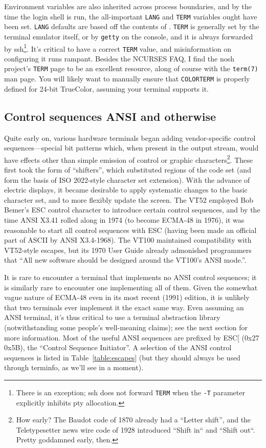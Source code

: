 Environment variables are also inherited across process boundaries, and by the
time the login shell is run, the all-important \texttt{LANG} and \texttt{TERM}
variables ought have been set. \texttt{LANG} defaults are based off the contents
of . \texttt{TERM} is generally set by the terminal emulator itself,
or by \texttt{getty} on the console, and it is always forwarded by ssh\footnote{There is an exception; ssh does not forward \texttt{TERM} when the \texttt{-T}
parameter explicitly inhibits pty allocation.}. It's critical to have a correct \texttt{TERM}
value, and misinformation on configuring it runs rampant. Besides the NCURSES FAQ\cite{ncursesfaq},
I find the nosh project's \texttt{TERM} page\cite{noshterm} to be an excellent
resource, along of course with the \texttt{term(7)} man page\cite{term7}. You
will likely want to manually ensure that \texttt{COLORTERM} is properly defined
for 24-bit TrueColor, assuming your terminal supports it.

\subsection{Control sequences ANSI and otherwise}
\label{sec:escapes}
Quite early on, various hardware terminals began adding vendor-specific control
sequences---special bit patterns which, when present in the output stream,
would have effects other than simple emission of control or graphic
characters\footnote{How early? The Baudot code of 1870 already had a ``Letter
shift'', and the Teletypesetter news wire code of 1928 introduced ``Shift
in`` and ``Shift out``. Pretty goddamned early, then.}. These first took the
form of ``shifters'', which substituted regions of the code set (and form the
basis of ISO 2022-style character set extension). With the advance of electric
displays, it became desirable to apply systematic changes to the basic
character set, and to more flexibly update the screen. The VT52 employed Bob
Bemer's ESC control character\cite{bemeresc} to introduce certain control
sequences, and by the time ANSI X3.41 rolled along in 1974 (to become ECMA-48 in
1976), it was reasonable to start all control sequences with ESC (having been
made an official part of ASCII by ANSI X3.4-1968). The VT100 maintained
compatibility with VT52-style escapes, but its 1970 User Guide already
admonished programmers that ``All new software should be designed around the
VT100's ANSI mode.''\cite{vt100}.

It is rare to encounter a terminal that implements no ANSI control sequences; it is
similarly rare to encounter one implementing all of them. Given the somewhat
vague nature of ECMA-48 even in its most recent (1991) edition\cite{ecma48}, it is unlikely
that two terminals ever implement it the exact same way. Even assuming an ANSI
terminal, it's thus critical to use a terminal abstraction library (notwithstanding
some people's well-meaning claims\cite{lexihale}); see the next section for
more information. Most of the useful ANSI sequences are prefixed by ESC[ (0x27 0x5B),
the ``Control Sequence Initiator''. A selection of the ANSI control sequences
is listed in Table~\ref{table:escapes} (but they should always be used through
terminfo, as we'll see in a moment).

